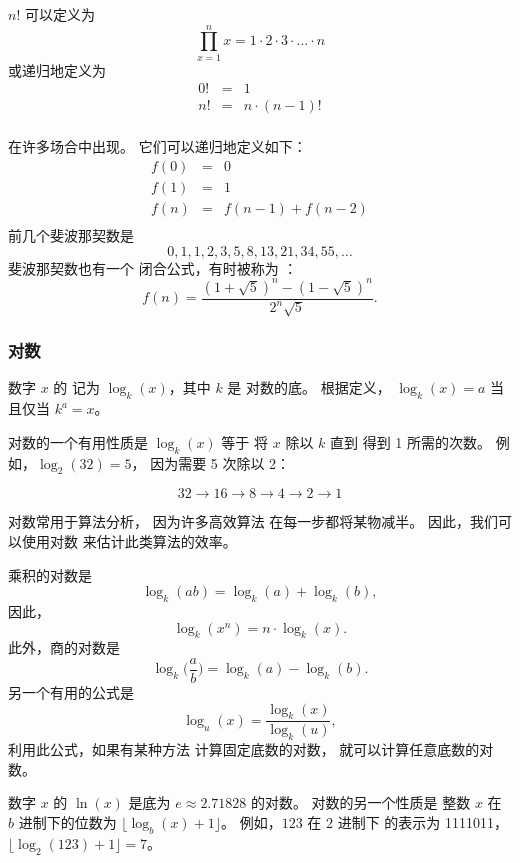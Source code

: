 
 $n!$ 可以定义为
\[\prod_{x=1}^n x = 1 \cdot 2 \cdot 3 \cdot \ldots \cdot n\]
或递归地定义为
\[
\begin{array}{lcl}
0! & = & 1 \\
n! & = & n \cdot (n-1)! \\
\end{array}
\]


在许多场合中出现。
它们可以递归地定义如下：
\[
\begin{array}{lcl}
f(0) & = & 0 \\
f(1) & = & 1 \\
f(n) & = & f(n-1)+f(n-2) \\
\end{array}
\]
前几个斐波那契数是
\[0, 1, 1, 2, 3, 5, 8, 13, 21, 34, 55, \ldots\]
斐波那契数也有一个
闭合公式，有时被称为
 ：
\[f(n)=\frac{(1 + \sqrt{5})^n - (1-\sqrt{5})^n}{2^n \sqrt{5}}.\]

\subsubsection{对数}


数字 $x$ 的
记为 $\log_k(x)$，其中 $k$ 是
对数的底。
根据定义，
$\log_k(x)=a$ 当且仅当 $k^a=x$。

对数的一个有用性质是
$\log_k(x)$ 等于
将 $x$ 除以 $k$ 直到
得到 1 所需的次数。
例如，$\log_2(32)=5$，
因为需要 5 次除以 2：

\[32 \rightarrow 16 \rightarrow 8 \rightarrow 4 \rightarrow 2 \rightarrow 1 \]

对数常用于算法分析，
因为许多高效算法
在每一步都将某物减半。
因此，我们可以使用对数
来估计此类算法的效率。

乘积的对数是
\[\log_k(ab) = \log_k(a)+\log_k(b),\]
因此，
\[\log_k(x^n) = n \cdot \log_k(x).\]
此外，商的对数是
\[\log_k\Big(\frac{a}{b}\Big) = \log_k(a)-\log_k(b).\]
另一个有用的公式是
\[\log_u(x) = \frac{\log_k(x)}{\log_k(u)},\]
利用此公式，如果有某种方法
计算固定底数的对数，
就可以计算任意底数的对数。


数字 $x$ 的 $\ln(x)$
是底为 $e \approx 2.71828$ 的对数。
对数的另一个性质是
整数 $x$ 在 $b$ 进制下的位数为
$\lfloor \log_b(x)+1 \rfloor$。
例如，$123$ 在 $2$ 进制下
的表示为 1111011，
$\lfloor \log_2(123)+1 \rfloor = 7$。

